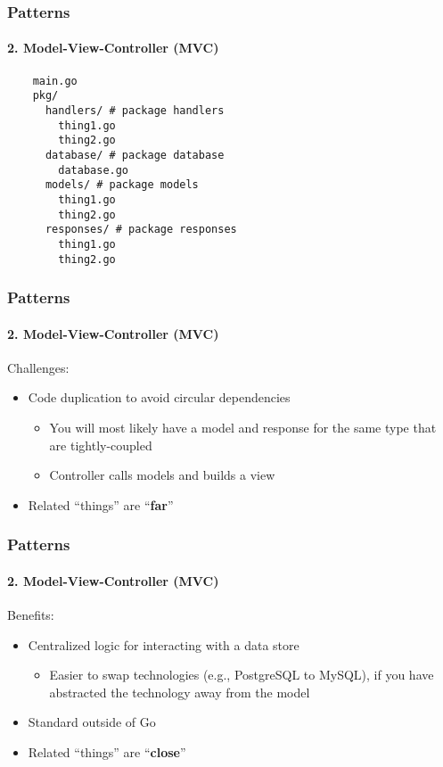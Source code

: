 \begin{frame}[fragile]
  \frametitle{Patterns}
  \framesubtitle{2. Model-View-Controller (MVC)}

  \begin{verbatim}
    main.go
    pkg/
      handlers/ # package handlers
        thing1.go
        thing2.go
      database/ # package database
        database.go
      models/ # package models
        thing1.go
        thing2.go
      responses/ # package responses
        thing1.go
        thing2.go
  \end{verbatim}
\end{frame}

\begin{frame}[fragile]
  \frametitle{Patterns}
  \framesubtitle{2. Model-View-Controller (MVC)}

  Challenges:
  \begin{itemize}
    \pause
    \item Code duplication to avoid circular dependencies
    \begin{itemize}
      \item You will most likely have a model and response for the same type that are tightly-coupled
      \item Controller calls models and builds a view
    \end{itemize}
    \pause
    \item Related ``things'' are ``\textbf{far}''
  \end{itemize}
\end{frame}

\begin{frame}[fragile]
  \frametitle{Patterns}
  \framesubtitle{2. Model-View-Controller (MVC)}

  Benefits:
  \begin{itemize}
    \pause
    \item Centralized logic for interacting with a data store
    \begin{itemize}
      \item Easier to swap technologies (e.g., PostgreSQL to MySQL), if you have abstracted the technology away from the model
    \end{itemize}
    \pause
    \item Standard outside of Go
    \pause
    \item Related ``things'' are ``\textbf{close}''
  \end{itemize}

\end{frame}

